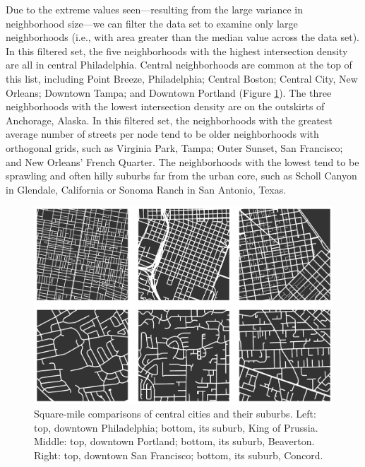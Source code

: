 \documentclass{article}
\begin{document}
Due to the extreme values seen---resulting from the large variance in neighborhood size---we can filter the data set to examine only large neighborhoods (i.e., with area greater than the median value across the data set). In this filtered set, the five neighborhoods with the highest intersection density are all in central Philadelphia. Central neighborhoods are common at the top of this list, including Point Breeze, Philadelphia; Central Boston; Central City, New Orleans; Downtown Tampa; and Downtown Portland (Figure \ref{fig05}). The three neighborhoods with the lowest intersection density are on the outskirts of Anchorage, Alaska. In this filtered set, the neighborhoods with the greatest average number of streets per node tend to be older neighborhoods with orthogonal grids, such as Virginia Park, Tampa; Outer Sunset, San Francisco; and New Orleans' French Quarter. The neighborhoods with the lowest tend to be sprawling and often hilly suburbs far from the urban core, such as Scholl Canyon in Glendale, California or Sonoma Ranch in San Antonio, Texas.

\begin{figure}[h]
	\includegraphics[width=1\textwidth]{media/fig05.png}
	\caption{Square-mile comparisons of central cities and their suburbs. Left: top, downtown Philadelphia; bottom, its suburb, King of Prussia. Middle: top, downtown Portland; bottom, its suburb, Beaverton. Right: top, downtown San Francisco; bottom, its suburb, Concord.}
	\label{fig05}
\end{figure}
\end{document}
